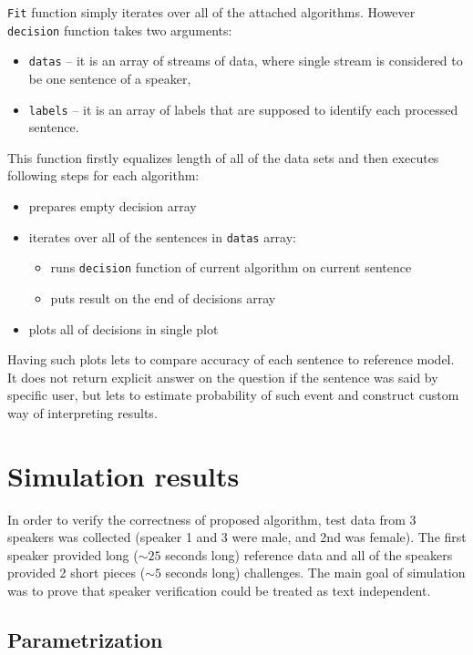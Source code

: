 \documentclass[magister]{dyplom}
\begin{document}
	\texttt{Fit} function simply iterates over all of the attached algorithms. However \texttt{decision} function takes two arguments:
	
	\begin{itemize}
		\item \texttt{datas} -- it is an array of streams of data, where single stream is considered to be one sentence of a speaker,
		\item \texttt{labels} -- it is an array of labels that are supposed to identify each processed sentence.
	\end{itemize}
	
	This function firstly equalizes length of all of the data sets and then executes following steps for each algorithm:
	
	\begin{itemize}
		\item prepares empty decision array
		\item iterates over all of the sentences in \texttt{datas} array:
			\begin{itemize}
				\item runs \texttt{decision} function of current algorithm on current sentence
				\item puts result on the end of decisions array
			\end{itemize}		
		\item plots all of decisions in single plot
	\end{itemize}
	
	Having such plots lets to compare accuracy of each sentence to reference model. It does not return explicit answer on the question if the sentence was said by specific user, but lets to estimate probability of such event and construct custom way of interpreting results.\\
	
	\chapter{Simulation results}
	
	In order to verify the correctness of proposed algorithm, test data from 3 speakers was collected (speaker 1 and 3 were male, and 2nd was female). The first speaker provided long ($\sim25$ seconds long) reference data and all of the speakers provided 2 short pieces ($\sim5$ seconds long) challenges. The main goal of simulation was to prove that speaker verification could be treated as text independent.
	
	\section{Parametrization}
	
\end{document}
